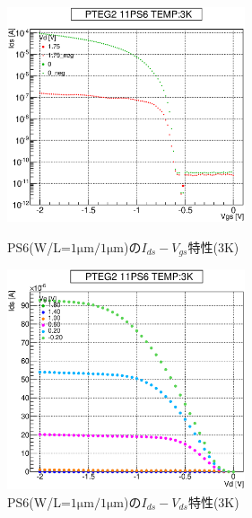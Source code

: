 				\begin{figure}[htbp]
					\begin{minipage}{0.5\hsize}
						\begin{center}
							\includegraphics[width=70mm]{./Chapter/Appendix/Picture/PST/PS6/PTEG2_11_PS6_IdVg_3K.eps}
						\end{center}
						\caption{PS6(W/L=$1\mathrm{\mu m}/1\mathrm{\mu m}$)の$I_{ds}-V_{gs}$特性(3K)}
						\label{fig:PS6_IdVg_3K}
					\end{minipage}
					\begin{minipage}{0.5\hsize}
						\begin{center}
							\includegraphics[width=70mm]{./Chapter/Appendix/Picture/PST/PS6/PTEG2_11_PS6_IdVd_3K.eps}
						\end{center}
						\caption{PS6(W/L=$1\mathrm{\mu m}/1\mathrm{\mu m}$)の$I_{ds}-V_{ds}$特性(3K)}
						\label{fig:PS6_IdVd_3K}
					\end{minipage}
				\end{figure}
